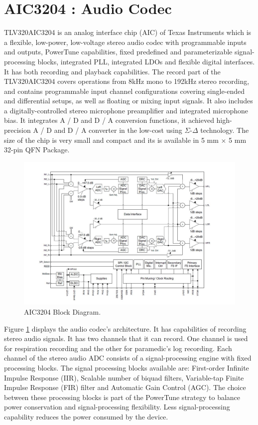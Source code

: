 \section{AIC3204 : Audio Codec}
TLV320AIC3204 is an analog interface chip (AIC) of Texas Instruments which is a flexible, low-power, low-voltage stereo audio codec with programmable inputs and outputs, PowerTune capabilities, fixed predefined and parameterizable signal-processing blocks, integrated PLL, integrated LDOs and flexible digital interfaces. It has both recording and playback capabilities. The record part of the TLV320AIC3204 covers operations from 8kHz mono to 192kHz stereo recording, and contains programmable input channel configurations covering single-ended and differential setups, as well as floating or mixing input signals. It also includes a digitally-controlled stereo microphone preamplifier and integrated microphone bias. It integrates A / D and D / A conversion functions, it achieved high-precision A / D and D / A converter in the low-cost using $\Sigma$-$\Delta$ technology. The size of the chip is very small and compact and its is available in 5 mm × 5 mm 32-pin QFN Package. 

\begin{figure}[h]
	\centering
	\includegraphics[scale = 0.7 ]{AIC3204.JPG}
	\caption{AIC3204 Block Diagram. \cite{audiocodec}\label{aic3204}}
\end{figure}

Figure \ref{aic3204} displays the audio codec's architecture. It has capabilities of recording stereo audio signals. It has two channels that it can record. One channel is used for respiration recording and the other for paramedic's log recording. Each channel of the stereo audio ADC consists of a signal-processing engine with fixed processing blocks. The signal processing blocks available are: First-order Infinite Impulse Response (IIR), Scalable number of biquad filters, Variable-tap Finite Impulse Response (FIR) filter and Automatic Gain Control (AGC). The choice between these processing blocks is part of the PowerTune strategy to balance power conservation and signal-processing flexibility. Less signal-processing capability reduces the power
consumed by the device.
